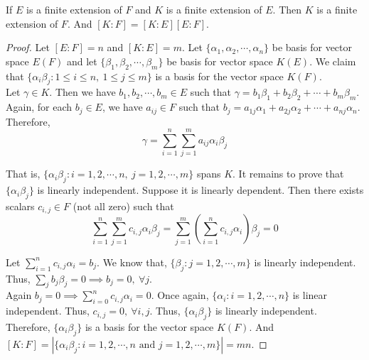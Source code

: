 \begin{theorem}
	If $E$ is a finite extension of $F$ and $K$ is a finite extension of $E$.
	Then $K$ is a finite extension of $F$.
	And $[K:F] = [K:E][E:F]$.
\end{theorem}
\begin{proof}
	Let $[E:F] = n$ and $[K:E] = m$.
	Let $\{ \alpha_1,\alpha_2,\cdots,\alpha_n \}$ be basis for vector space $E(F)$ and let $\{ \beta_1,\beta_2,\cdots,\beta_m\}$ be basis for vector space $K(E)$.
	We claim that $\{\alpha_i\beta_j : 1 \le i \le n,\ 1 \le j \le m \}$ is a basis for the vector space $K(F)$.\\

	Let $\gamma \in K$.
	Then we have $b_1,b_2,\cdots,b_m \in E$ such that $\gamma = b_1\beta_1+b_2\beta_2+\cdots+b_m\beta_m$.
	Again, for each $b_j \in E$, we have $a_{ij} \in F$ such that $b_j = a_{1j}\alpha_1+a_{2j}\alpha_2+\cdots+a_{nj}\alpha_n$.
	Therefore, 
	\[\gamma = \sum_{i=1}^n \sum_{j=1}^m a_{ij} \alpha_i \beta_j\]

	That is, $\{ \alpha_i \beta_j : i =1,2,\cdots,n,\ j=1,2,\cdots,m \}$ spans $K$.
	It remains to prove that $\{\alpha_i \beta_j \}$ is linearly independent.
	Suppose it is linearly dependent.
	Then there exists scalars $c_{i,j} \in F$ (not all zero) such that
	\[\sum_{i=1}^n \sum_{j=1}^m c_{i,j} \alpha_i \beta_j  = \sum_{j=1}^m \left( \sum_{i=1}^n c_{i,j} \alpha_i \right) \beta_j  = 0\]
	
	Let $\sum_{i=1}^n c_{i,j}\alpha_i = b_j$.
	We know that, $\{ \beta_j : j = 1,2,\cdots,m \}$ is linearly independent.
	Thus, $\sum_j b_j \beta_j = 0 \implies b_j = 0,\ \forall j$.\\
	

	Again $b_j = 0 \implies \sum_{i = 0}^n c_{i,j}\alpha_i = 0$.
	Once again, $\{ \alpha_i : i = 1,2,\cdots,n \}$ is linear independent.
	Thus, $c_{i,j} = 0,\ \forall i,j$.
	Thus, $\{ \alpha_i \beta_j \}$ is linearly independent.
	Therefore, $\{ \alpha_i \beta_j \}$ is a basis for the vector space $K(F)$.
	And $[K : F] = |\{\alpha_i \beta_j : i =1,2,\cdots,n \text{ and } j=1,2,\cdots,m\}|= mn$.
\end{proof}

